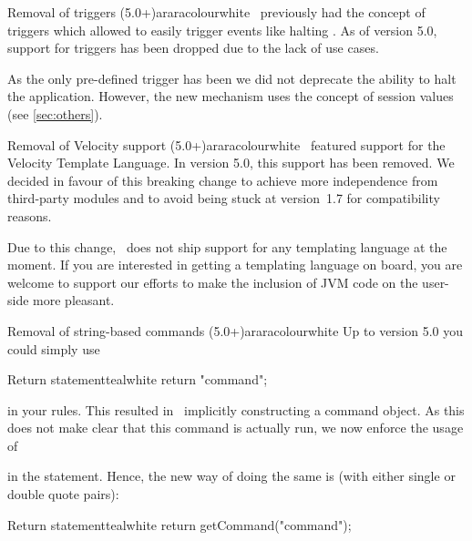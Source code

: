 \begin{messagebox}{Removal of triggers (5.0+)}{araracolour}{\icattention}{white}
\setlength{\parskip}{1em}
\arara\ previously had the concept of triggers which allowed to easily trigger events like halting \arara. As of version 5.0, support for triggers has been dropped due to the lack of use cases.

As the only pre-defined trigger has been  we did not deprecate the ability to halt the application. However, the new mechanism uses the concept of session values (see \autoref{sec:others}).
\end{messagebox}

\begin{messagebox}{Removal of Velocity support (5.0+)}{araracolour}{\icinfo}{white}
\setlength{\parskip}{1em}
\arara\ featured support for the Velocity Template Language. In version 5.0, this support has been removed. We decided in favour of this breaking change to achieve more independence from third-party modules and to avoid being stuck at version~1.7 for compatibility reasons.

Due to this change, \arara\ does not ship support for any templating language at the moment. If you are interested in getting a templating language on board, you are welcome to support our efforts to make the inclusion of JVM code on the user-side more pleasant.
\end{messagebox}

\begin{messagebox}{Removal of string-based commands (5.0+)}{araracolour}{\icinfo}{white}
Up to version 5.0 you could simply use

\begin{codebox}{Return statement}{teal}{\icnote}{white}
return "command";
\end{codebox}

\noindent in your rules. This resulted in \arara\ implicitly constructing a command object. As this does not make clear that this command is actually run, we now enforce the usage of

\vspace{1em}


\vspace{1em}

\noindent in the  statement. Hence, the new way of doing the same is (with either single or double quote pairs):

\begin{codebox}{Return statement}{teal}{\icnote}{white}
return getCommand("command");
\end{codebox}
\end{messagebox}

